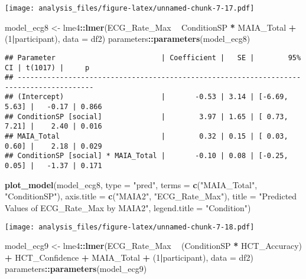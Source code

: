 \documentclass[
]{article}
\newenvironment{Shaded}{\begin{snugshade}}{\end{snugshade}}
\newcommand{\DataTypeTok}[1]{\textcolor[rgb]{0.13,0.29,0.53}{#1}}
\newcommand{\DecValTok}[1]{\textcolor[rgb]{0.00,0.00,0.81}{#1}}
\newcommand{\KeywordTok}[1]{\textcolor[rgb]{0.13,0.29,0.53}{\textbf{#1}}}
\newcommand{\NormalTok}[1]{#1}
\newcommand{\OperatorTok}[1]{\textcolor[rgb]{0.81,0.36,0.00}{\textbf{#1}}}
\newcommand{\StringTok}[1]{\textcolor[rgb]{0.31,0.60,0.02}{#1}}
\begin{document}
\texttt{[image: analysis\_files/figure-latex/unnamed-chunk-7-17.pdf]}

\begin{Shaded}
\begin{Highlighting}[]
\NormalTok{model_ecg8 <-}\StringTok{ }\NormalTok{lme4}\OperatorTok{::}\KeywordTok{lmer}\NormalTok{(ECG_Rate_Max }\OperatorTok{~}\StringTok{ }\NormalTok{ConditionSP }\OperatorTok{*}\StringTok{ }\NormalTok{MAIA_Total }\OperatorTok{+}\StringTok{ }\NormalTok{(}\DecValTok{1}\OperatorTok{|}\NormalTok{participant), }\DataTypeTok{data =}\NormalTok{ df2)}
\NormalTok{parameters}\OperatorTok{::}\KeywordTok{parameters}\NormalTok{(model_ecg8)}
\end{Highlighting}
\end{Shaded}

\begin{verbatim}
## Parameter                         | Coefficient |   SE |        95% CI | t(1017) |     p
## ----------------------------------------------------------------------------------------
## (Intercept)                       |       -0.53 | 3.14 | [-6.69, 5.63] |   -0.17 | 0.866
## ConditionSP [social]              |        3.97 | 1.65 | [ 0.73, 7.21] |    2.40 | 0.016
## MAIA_Total                        |        0.32 | 0.15 | [ 0.03, 0.60] |    2.18 | 0.029
## ConditionSP [social] * MAIA_Total |       -0.10 | 0.08 | [-0.25, 0.05] |   -1.37 | 0.171
\end{verbatim}

\begin{Shaded}
\begin{Highlighting}[]
\KeywordTok{plot_model}\NormalTok{(model_ecg8, }\DataTypeTok{type =} \StringTok{"pred"}\NormalTok{, }\DataTypeTok{terms =} \KeywordTok{c}\NormalTok{(}\StringTok{"MAIA_Total"}\NormalTok{, }\StringTok{"ConditionSP"}\NormalTok{), }\DataTypeTok{axis.title =} \KeywordTok{c}\NormalTok{(}\StringTok{"MAIA2"}\NormalTok{, }\StringTok{"ECG_Rate_Max"}\NormalTok{), }\DataTypeTok{title =} \StringTok{"Predicted Values of ECG_Rate_Max by MAIA2"}\NormalTok{, }\DataTypeTok{legend.title =} \StringTok{"Condition"}\NormalTok{)}
\end{Highlighting}
\end{Shaded}

\texttt{[image: analysis\_files/figure-latex/unnamed-chunk-7-18.pdf]}

\begin{Shaded}
\begin{Highlighting}[]
\NormalTok{model_ecg9 <-}\StringTok{ }\NormalTok{lme4}\OperatorTok{::}\KeywordTok{lmer}\NormalTok{(ECG_Rate_Max }\OperatorTok{~}\StringTok{ }\NormalTok{(ConditionSP }\OperatorTok{*}\StringTok{ }\NormalTok{HCT_Accuracy) }\OperatorTok{+}\StringTok{ }\NormalTok{HCT_Confidence }\OperatorTok{+}\StringTok{ }\NormalTok{MAIA_Total }\OperatorTok{+}\StringTok{ }\NormalTok{(}\DecValTok{1}\OperatorTok{|}\NormalTok{participant), }\DataTypeTok{data =}\NormalTok{ df2)}
\NormalTok{parameters}\OperatorTok{::}\KeywordTok{parameters}\NormalTok{(model_ecg9)}
\end{Highlighting}
\end{Shaded}
\end{document}
